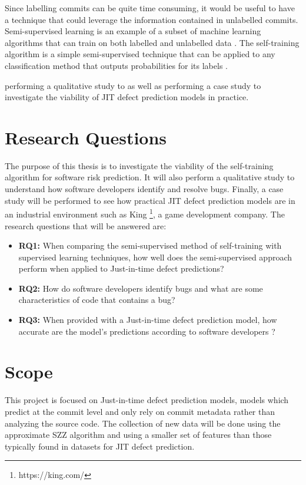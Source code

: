 \documentclass[../main.tex]{subfiles}
\begin{document}
Since labelling commits can be quite time consuming, it would be useful to have a technique that could leverage the information contained in unlabelled commits. Semi-supervised learning is an example of a subset of machine learning algorithms that can train on both labelled and unlabelled data \cite{zhu2005semi}. The self-training algorithm is a simple semi-supervised technique that can be applied to any classification method that outputs probabilities for its labels \cite{zhu2007semi}. 

 performing a qualitative study to  as well as performing a case study to investigate the viability of JIT defect prediction models in practice.


\section{Research Questions}

The purpose of this thesis is to investigate the viability of the self-training algorithm for software risk prediction. It will also perform a qualitative study to understand how software developers identify and resolve bugs. Finally, a case study will be performed to see how practical JIT defect prediction models are in an industrial environment such as King \footnote{https://king.com/}, a game development company. The research questions that will be answered are:

\begin{itemize}
  \item \textbf{RQ1:} When comparing the semi-supervised method of self-training with supervised learning techniques, how well does the semi-supervised approach perform when applied to Just-in-time defect predictions?
  \item \textbf{RQ2:} How do software developers identify bugs and what are some characteristics of code that contains a bug?
  \item \textbf{RQ3:} When provided with a Just-in-time defect prediction model, how accurate are the model's predictions according to software developers ? 
\end{itemize}

\section{Scope}

This project is focused on Just-in-time defect prediction models, models which predict at the commit level and only rely on commit metadata rather than analyzing the source code. The collection of new data will be done using the approximate SZZ algorithm and using a smaller set of features than those typically found in datasets for JIT defect prediction. 
\end{document}
